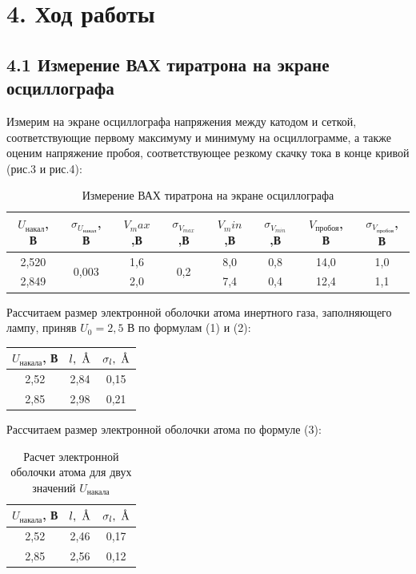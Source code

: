 \documentclass[a4paper,12pt]{report}
\begin{document}
\section*{4. Ход работы}
\subsection*{4.1 Измерение ВАХ тиратрона на экране осциллографа}
Измерим на экране осциллографа напряжения между катодом и сеткой, соответствующие первому максимуму и минимуму на осциллограмме, а также оценим напряжение пробоя, соответствующее резкому скачку тока в конце кривой (рис.3 и рис.4):

\begin{table}[H]
\begin{tabular}{|c|c|c|c|c|c|c|c|}
\hline
$U_{\text{накал}}$, В & $\sigma_{U_{\text{накал}}}$, В              & $V_max$,В & $\sigma_{V_{max}}$,В          & $V_min$,В & $\sigma_{V_{min}}$,В & $V_{\text{пробоя}}$, В & $\sigma_{V_{\text{пробоя}}}$, В \\ \hline
2,520     & \multirow{2}{*}{0,003} & 1,6    & \multirow{2}{*}{0,2} & 8,0    & 0,8         & 14,0       & 1,0             \\ \cline{1-1} \cline{3-3} \cline{5-8} 
2,849     &                        & 2,0    &                      & 7,4    & 0,4         & 12,4       & 1,1             \\ \hline
\end{tabular}
\caption{Измерение ВАХ тиратрона на экране осциллографа}
\end{table}

Рассчитаем размер электронной оболочки атома инертного газа, заполняющего лампу, приняв $U_{0} = 2,5$ В по формулам (1) и (2):

\begin{table}[H]
\begin{tabular}{|c|c|c|}
\hline
$U_{\text{накала}}$, В & $l, \textup{~\AA}$ & $\sigma_{l}, \textup{~\AA}$ \\ \hline
2,52       & 2,84 & 0,15      \\ \hline
2,85       & 2,98 & 0,21      \\ \hline
\end{tabular}
\end{table}

Рассчитаем размер электронной оболочки атома по формуле (3):

\begin{table}[H]
\begin{tabular}{|c|c|c|}
\hline
$U_{\text{накала}}$, В & $l, \textup{~\AA}$ & $\sigma_{l}, \textup{~\AA}$\\ \hline
2,52       & 2,46 & 0,17      \\ \hline
2,85       & 2,56 & 0,12      \\ \hline
\end{tabular}
\caption{Расчет электронной оболочки атома для двух значений $U_{\text{накала}}$}
\end{table}
\end{document}

